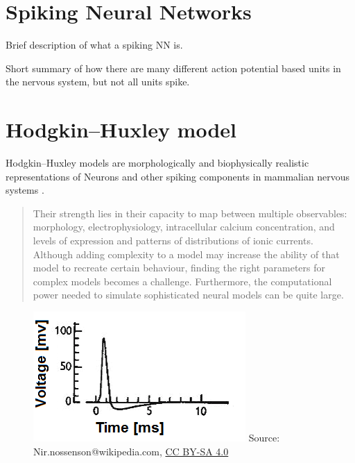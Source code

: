 \section{Spiking Neural Networks}

Brief description of what a spiking NN is.

Short summary of how there are many different action potential based units in
the nervous system, but not all units spike.

\section{Hodgkin–Huxley model}

Hodgkin–Huxley models are morphologically and biophysically realistic
representations of Neurons and other spiking components in mammalian nervous
systems \autocite{hodgkin_quantitative_1952}.

\begin{quote}
     Their strength lies in their capacity to map between multiple observables: morphology, electrophysiology, intracellular calcium concentration, and levels of expression and patterns of distributions of ionic currents. Although adding complexity to a model may increase the ability of that model to recreate certain behaviour, finding the right parameters for complex models becomes a challenge\autocite{prinz_alternative_2003}. Furthermore, the computational power needed to simulate sophisticated neural models can be quite large\autocite{markram_reconstruction_2015}.
\end{quote}  

\begin{figure}
    \centering
    \includegraphics{figures/graphs/huxhog_spike.png}
    {\small{Source: Nir.nossenson@wikipedia.com, 
        \href{https://creativecommons.org/licenses/by-sa/4.0/deed.en}{CC BY-SA 4.0}}}
    \label{neuronalactionpotentialexample}
\end{figure}

